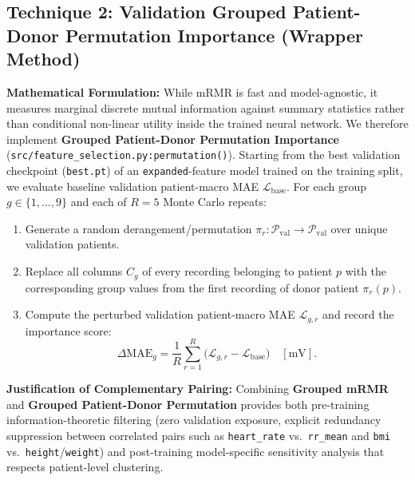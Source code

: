 \documentclass[11pt,a4paper]{article}
\begin{document}
\subsection{Technique 2: Validation Grouped Patient-Donor Permutation Importance (Wrapper Method)}
\textbf{Mathematical Formulation:} While mRMR is fast and model-agnostic, it measures marginal discrete mutual information against summary statistics rather than conditional non-linear utility inside the trained neural network. We therefore implement \textbf{Grouped Patient-Donor Permutation Importance} (\texttt{src/feature\_selection.py:permutation()}). Starting from the best validation checkpoint (\texttt{best.pt}) of an \texttt{expanded}-feature model trained on the training split, we evaluate baseline validation patient-macro MAE $\mathcal{L}_{\text{base}}$. For each group $g \in \{1,\dots,9\}$ and each of $R = 5$ Monte Carlo repeats:
\begin{enumerate}
    \item Generate a random derangement/permutation $\pi_r : \mathcal{P}_{\text{val}} \to \mathcal{P}_{\text{val}}$ over unique validation patients.
    \item Replace all columns $C_g$ of every recording belonging to patient $p$ with the corresponding group values from the first recording of donor patient $\pi_r(p)$.
    \item Compute the perturbed validation patient-macro MAE $\mathcal{L}_{g,r}$ and record the importance score:
    \begin{equation}
        \Delta \text{MAE}_g = \frac{1}{R} \sum_{r=1}^{R} \big(\mathcal{L}_{g,r} - \mathcal{L}_{\text{base}}\big) \quad [\text{mV}].
    \end{equation}
\end{enumerate}
\textbf{Justification of Complementary Pairing:} Combining \textbf{Grouped mRMR} and \textbf{Grouped Patient-Donor Permutation} provides both pre-training information-theoretic filtering (zero validation exposure, explicit redundancy suppression between correlated pairs such as \texttt{heart\_rate} vs.\ \texttt{rr\_mean} and \texttt{bmi} vs.\ \texttt{height}/\texttt{weight}) and post-training model-specific sensitivity analysis that respects patient-level clustering.
\end{document}
